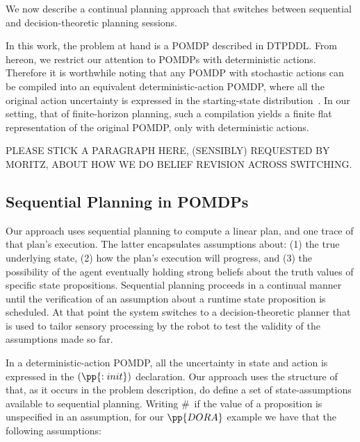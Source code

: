 

We now describe a continual planning approach that switches between
sequential and decision-theoretic planning sessions. 


In this work, the problem at hand is a POMDP described in DTPDDL. From
hereon, we restrict our attention to POMDPs with deterministic
actions. Therefore it is worthwhile noting that any POMDP with
stochastic actions can be compiled into an equivalent
deterministic-action POMDP, where all the original action uncertainty
is expressed in the starting-state
distribution~\cite{ng:Jordan:2000}. In our setting, that of
finite-horizon planning, such a compilation yields a finite flat
representation of the original POMDP, only with deterministic
actions. 


PLEASE STICK A PARAGRAPH HERE, (SENSIBLY) REQUESTED BY MORITZ, ABOUT
HOW WE DO BELIEF REVISION ACROSS SWITCHING.


\subsection{Sequential Planning in POMDPs}


Our approach uses sequential planning to compute a linear plan, and
one trace of that plan's execution. The latter encapsulates
assumptions about: (1) the true underlying state, (2) how the plan's
execution will progress, and (3) the possibility of the agent
eventually holding strong beliefs about the truth values of specific
state propositions. Sequential planning proceeds in a continual manner
until the verification of an assumption about a runtime state
proposition is scheduled. At that point the system switches to a
decision-theoretic planner that is used to tailor sensory processing
by the robot to test the validity of the assumptions made so far.

In a deterministic-action POMDP, all the uncertainty in state and
action is expressed in the $(\pp{:init})$ declaration. Our approach
uses the structure of that, as it occurs in the problem description,
do define a set of state-assumptions available to sequential planning.
Writing \#\ if the value of a proposition is unspecified in an
assumption, for our $\pp{DORA}$ example we have that the following
assumptions:

